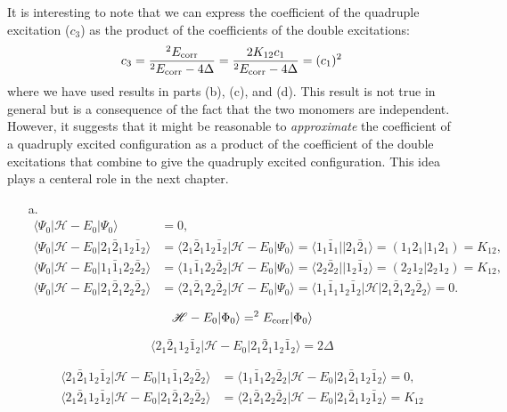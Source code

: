 \documentclass[a4paper]{book}
\newcommand{\corr}{{\rm corr}}
\begin{document}
\begin{exercise}
	It is interesting to note that we can express the coefficient of the quadruple excitation ($c_3$) as the product of the coefficients of the double excitations:
	\[
		c_3 = \frac{ {}^{2} E_\corr }{ {}^{2} E_\corr - 4\Delta } = \frac{ 2 K_{12} c_1 }{ {}^{2} E_\corr - 4\Delta } = (c_1)^2
	\]
	where we have used results in parts (b), (c), and (d). This result is not true in general but is a consequence of the fact that the two monomers are independent. However, it suggests that it might be reasonable to {\it approximate} the coefficient of a quadruply excited configuration as a product of the coefficient of the double excitations that combine to give the quadruply excited configuration. This idea plays a centeral role in the next chapter.
	\end{exercise}
	
	\begin{solution}
	
	\begin{itemize}
		
	\item[a.] 
	\begin{align*}
		\langle \Psi_0 | \mathscr{H} - E_0 | \Psi_0 \rangle &= 0 , \\
		 \langle \Psi_0 | \mathscr{H} - E_0 | 2_1 \bar{2}_1 1_2 \bar{1}_2 \rangle &= \langle 2_1 \bar{2}_1 1_2 \bar{1}_2 | \mathscr{H} - E_0 | \Psi_0 \rangle = \langle 1_1 \bar{1}_1 || 2_1 \bar{2}_1 \rangle = ( 1_1 2_1 | 1_1 2_1 ) = K_{12} , \\
		 \langle \Psi_0 | \mathscr{H} - E_0 | 1_1 \bar{1}_1 2_2 \bar{2}_2 \rangle &= \langle 1_1 \bar{1}_1 2_2 \bar{2}_2 | \mathscr{H} - E_0 | \Psi_0 \rangle = \langle 2_2 \bar{2}_2 || 1_2 \bar{1}_2 \rangle = ( 2_2 1_2 | 2_2 1_2 ) = K_{12} , \\
		 \langle \Psi_0 | \mathscr{H} - E_0 | 2_1 \bar{2}_1 2_2 \bar{2}_2 \rangle &= \langle 2_1 \bar{2}_1 2_2 \bar{2}_2 | \mathscr{H} - E_0 | \Psi_0 \rangle = \langle 1_1 \bar{1}_1 1_2 \bar{1}_2 | \mathscr{H} | 2_1 \bar{2}_1 2_2 \bar{2}_2 \rangle = 0.
	\end{align*}
	
	\[
		\mathscr{H} - E_0 | \Phi_0 \rangle = ^2 E_\corr | \Phi_0 \rangle
	\]	
	
	\[
		\langle 2_1 \bar{2}_1 1_2 \bar{1}_2 | \mathscr{H} - E_0 | 2_1 \bar{2}_1 1_2 \bar{1}_2 \rangle = 2 \Delta
	\]
	
	\begin{align*}
		\langle 2_1 \bar{2}_1 1_2 \bar{1}_2 | \mathscr{H} - E_0 | 1_1 \bar{1}_1 2_2 \bar{2}_2 \rangle &= \langle 1_1 \bar{1}_1 2_2 \bar{2}_2 | \mathscr{H} - E_0 | 2_1 \bar{2}_1 1_2 \bar{1}_2 \rangle = 0, \\
		\langle 2_1 \bar{2}_1 1_2 \bar{1}_2 | \mathscr{H} - E_0 | 2_1 \bar{2}_1 2_2 \bar{2}_2 \rangle &= \langle 2_1 \bar{2}_1 2_2 \bar{2}_2 | \mathscr{H} - E_0 | 2_1 \bar{2}_1 1_2 \bar{1}_2 \rangle = K_{12}	
	\end{align*}
	

\end{itemize}
\end{solution}
\end{document}
